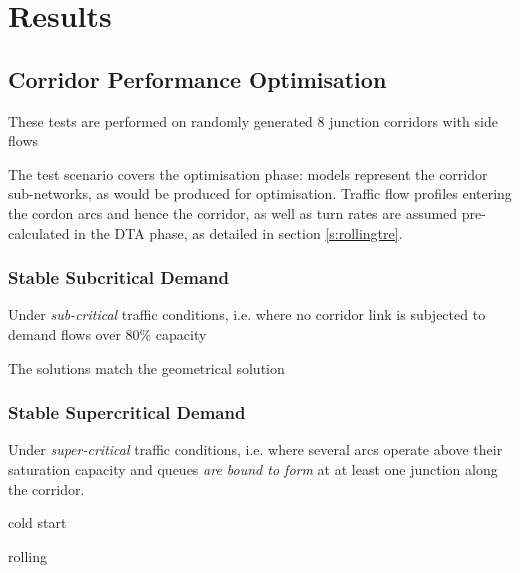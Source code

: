 
\chapter{Results} \label{c:results}


\section{Corridor Performance Optimisation} \label{r:kpi}
These tests are performed on randomly generated 8 junction corridors with side flows

The test scenario covers the optimisation phase: models represent the corridor sub-networks, as would be produced for optimisation. Traffic flow profiles entering the cordon arcs and hence the corridor, as well as turn rates are assumed pre-calculated in the DTA phase, as detailed in section \ref{s:rollingtre}.


\subsection{Stable Subcritical Demand}

Under \emph{sub-critical} traffic conditions, i.e. where no corridor link is subjected to demand flows over 80\% capacity 


The solutions match the geometrical solution


\subsection{Stable Supercritical Demand}
Under \emph{super-critical} traffic conditions, i.e. where several arcs operate above their saturation capacity and queues \emph{are bound to form} at at least one junction along the corridor.

cold start

rolling



